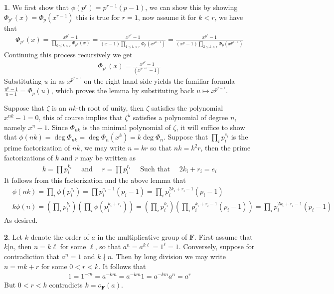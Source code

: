 \documentclass[11pt]{article}
\theoremstyle{definition}
\newtheorem{pb}{}
\newcommand{\tand}{\text{ and }}
\begin{document}
    \begin{pb}
        We first show that \(\phi(p^r) = p^{r-1}(p-1)\), we can show this by showing \(\Phi_{p^r}(x)= \Phi_p(x^{r-1})\) this is true for \(r = 1\), now assume it for \(k < r\), we have that
        \begin{align*}
            \Phi_{p^r}(x) = \frac{x^{p^r}-1}{\prod_{0 \leq k<r}\Phi_{p^k}(x)} 
            = \frac{x^{p^r}-1}{(x-1)\prod_{1 \leq k<r}\Phi_{p}(x^{p^{k-1}})}
            = \frac{x^{p^r}-1}{(x^p-1)\prod_{2 \leq k<r}\Phi_{p}(x^{p^{k-1}})}
        \end{align*}
        Continuing this process recursively we get
        \begin{align*}
            \Phi_{p^r}(x) = \frac{x^{p^r}-1}{(x^{p^{r-1}}-1)}
        \end{align*}
        Substituting \(u\) in as \(x^{p^{r-1}}\) on the right hand side yields the familiar formula
        \(\frac{u^p - 1}{u - 1} = \Phi_p(u)\), which proves the lemma by substituting back \(u \mapsto x^{p^{r-1}}\).

        Suppose that \(\zeta\) is an \(nk\)-th root of unity, then \(\zeta\) satisfies the polynomial \(x^{nk}-1=0\), this of course implies that \(\zeta^k\) satisfies a polynomial of degree \(n\), namely \(x^n-1\). Since \(\Phi_{nk}\) is the minimal polynomial of \(\zeta\), it will suffice to show that \(\phi(nk) = \deg\Phi_{nk} = \deg\Phi_n(x^k) = k\deg\Phi_n\).
        Suppose that \(\prod_i p_i^{e_i}\) is the prime factorization of \(nk\), we may write \(n = kr\) so that \(nk = k^2r\), then the prime factorizations of \(k \tand r\) may be written as
        \begin{align*}
            k = \prod p_i^{k_i} \quad \tand \quad r = \prod p_i^{r_i} \quad \text{ Such that } \quad 2k_i + r_i = e_i
        \end{align*}
        It follows from this factorization and the above lemma that
        \begin{align*}
            &\phi(nk) = \prod_i \phi(p_i^{e_i}) = \prod p_i^{e_i-1}(p_i-1) = \prod_i p_i^{2k_i+r_i-1}(p_i-1)\\
            &k\phi(n) = \left(\prod_i p_i^{k_i}\right)\left(\prod_i \phi(p_i^{k_i+r_i})\right)
            = \left(\prod_i p_i^{k_i}\right)\left(\prod_i p_i^{k_i+r_i-1}(p_i-1)\right) = \prod_i p_i^{2k_i+r_i-1}(p_i-1)
        \end{align*}
        As desired.
    \end{pb}
    \begin{pb}
        Let \(k\) denote the order of \(a\) in the multiplicative group of \(\mathbf{F}\). First assume that \(k \vert n\), then \(n = k\ell\) for some \(\ell\), so that \(a^n = a^{k\ell} = 1^\ell = 1\). Conversely, suppose for contradiction that \(a^n = 1\) and \(k \nmid n\). Then by long division we may write \(n = mk + r\) for some \(0 < r < k\). It follows that
        \begin{align*}
            1 = 1^{-m} = a^{-km} = a^{-km}1 = a^{-km}a^n = a^r
        \end{align*}
        But \(0 < r < k\) contradicts \(k = o_{\mathbf{F}}(a)\).
    \end{pb}
\end{document}

